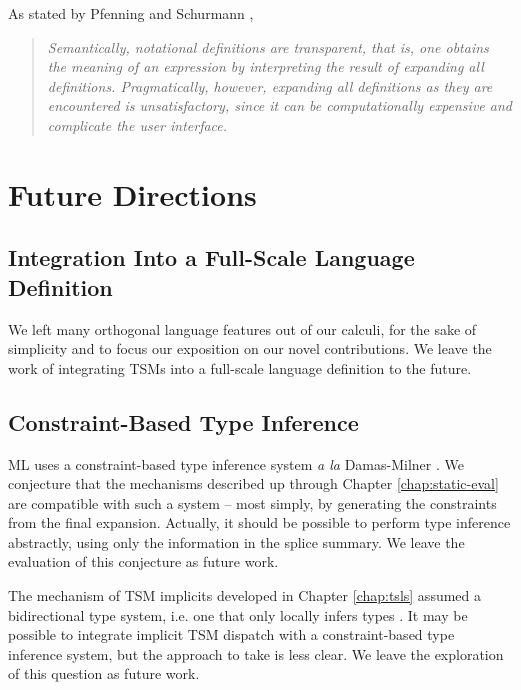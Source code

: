 As stated by Pfenning and Schurmann \cite{pfenning1998algorithms},
\begin{quote}
\emph{Semantically, notational definitions are transparent, that is, one obtains the meaning of an expression by
interpreting the result of expanding all definitions. Pragmatically, however, expanding
all definitions as they are encountered is unsatisfactory, since it can be
computationally expensive and complicate the user interface.}\end{quote}



\section{Future Directions}\label{sec:future-work}
\subsection{Integration Into a Full-Scale Language Definition}
We left many orthogonal language features out of our calculi, for the sake of simplicity and to focus our exposition on our novel contributions. We leave the work of integrating TSMs into a full-scale language definition to the future.

\subsection{Constraint-Based Type Inference}
ML uses a constraint-based type inference system \emph{a la} Damas-Milner \cite{damas1982principal}. We conjecture that the mechanisms described up through Chapter \ref{chap:static-eval} are compatible with such a system -- most simply, by generating the constraints from the final expansion. Actually, it should be possible to perform type inference abstractly, using only the information in the splice summary. We leave the evaluation of this conjecture as future work.

The mechanism of TSM implicits developed in Chapter \ref{chap:tsls} assumed a bidirectional type system, i.e. one that only locally infers types \cite{Pierce:2000:LTI:345099.345100}. It may be possible to integrate implicit TSM dispatch with a constraint-based type inference system, but the approach to take is less clear. We leave the exploration of this question as future work.

